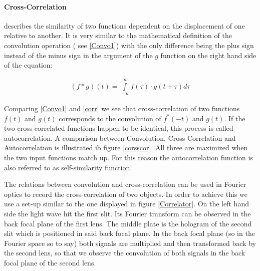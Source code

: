 
\paragraph{Cross-Correlation} describes the similarity of two functions dependent on the displacement of one relative to another. It is very similar to the mathematical definition of the convolution operation ( see \ref{Convo1}) with the only difference being the plus sign instead of the minus sign in the argument of the $g$ function on the right hand side of the equation:

\begin{align}
(f*g)(t)=\int\limits_{-\infty}^{\infty} f(\tau)\cdot g(t+\tau) d\tau \label{corr}
\end{align}

Comparing \ref{Convo1} and \ref{corr} we see that cross-correlation of two functions $f(t)$ and $g(t)$ corresponds to the convolution of $f^*(-t)$ and $g(t)$. If the two cross-correlated functions happen to be identical, this process is called autocorrelation.
A comparison between Convolution, Cross-Correlation and Autocorrelation is illustrated ib figure \ref{corsscor}. All three are maximized when the two input functions match up. For this reason the autocorrelation function is also referred to as self-similarity function.

 

The relations between convolution and cross-correlation can be used in Fourier optics to record the cross-correlation of two objects. In order to achieve this we use a set-up similar to the one displayed in figure \ref{Correlator}. On the left hand side the light wave hit the first slit. Its Fourier transform can be observed in the back focal plane of the first lens. The middle plate is the hologram of the second slit which is positioned in said back focal plane. In the back focal plane (so in the Fourier space so to say) both signals are multiplied and then transformed back by the second lens, so that we observe the convolution of both signals in the back focal plane of the second lens.


